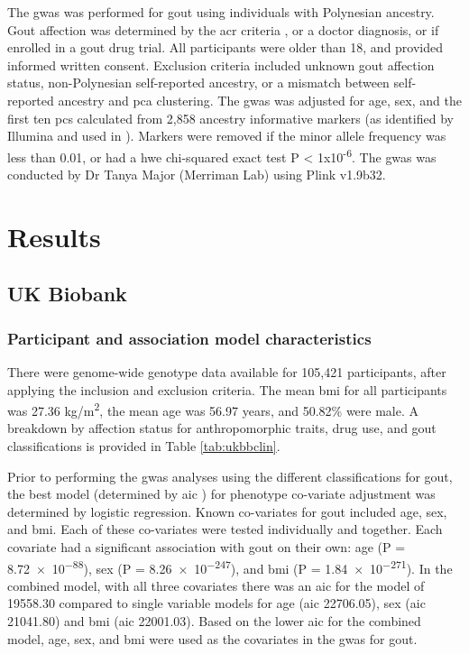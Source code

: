 \documentclass[]{report}
\begin{document}
The \gls{gwas} was performed for gout using individuals with Polynesian
ancestry. Gout affection was determined by the \gls{acr} criteria
\citep{Wallace1977a}, or a doctor diagnosis, or if enrolled in a gout
drug trial. All participants were older than 18, and provided informed
written consent. Exclusion criteria included unknown gout affection
status, non-Polynesian self-reported ancestry, or a mismatch between
self-reported ancestry and \gls{pca} clustering. The \gls{gwas} was
adjusted for age, sex, and the first ten \glspl{pc} calculated from
2,858 ancestry informative markers (as identified by Illumina and used
in \citet{Guo2014}). Markers were removed if the minor allele frequency
was less than 0.01, or had a \gls{hwe} chi-squared exact test P
\textless{} 1x10\textsuperscript{-6}. The \gls{gwas} was conducted by Dr
Tanya Major (Merriman Lab) using Plink v1.9b32.

\section{Results}\label{results-2}

\subsection{UK Biobank}\label{uk-biobank}

\subsubsection{Participant and association model
characteristics}\label{participant-and-association-model-characteristics}

There were genome-wide genotype data available for 105,421 participants,
after applying the inclusion and exclusion criteria. The mean \gls{bmi}
for all participants was 27.36 kg/m\textsuperscript{2}, the mean age was
56.97 years, and 50.82\% were male. A breakdown by affection status for
anthropomorphic traits, drug use, and gout classifications is provided
in Table \ref{tab:ukbbclin}.

Prior to performing the \gls{gwas} analyses using the different
classifications for gout, the best model (determined by \gls{aic}
\citep{Akaike1974}) for phenotype co-variate adjustment was determined
by logistic regression. Known co-variates for gout included age, sex,
and \gls{bmi}. Each of these co-variates were tested individually and
together. Each covariate had a significant association with gout on
their own: age (P = \num{8.72e-88}), sex (P = \num{8.26e-247}), and
\gls{bmi} (P = \num{1.84e-271}). In the combined model, with all three
covariates there was an \gls{aic} for the model of 19558.30 compared to
single variable models for age (\gls{aic} 22706.05), sex (\gls{aic}
21041.80) and \gls{bmi} (\gls{aic} 22001.03). Based on the lower
\gls{aic} for the combined model, age, sex, and \gls{bmi} were used as
the covariates in the \gls{gwas} for gout.
\end{document}
